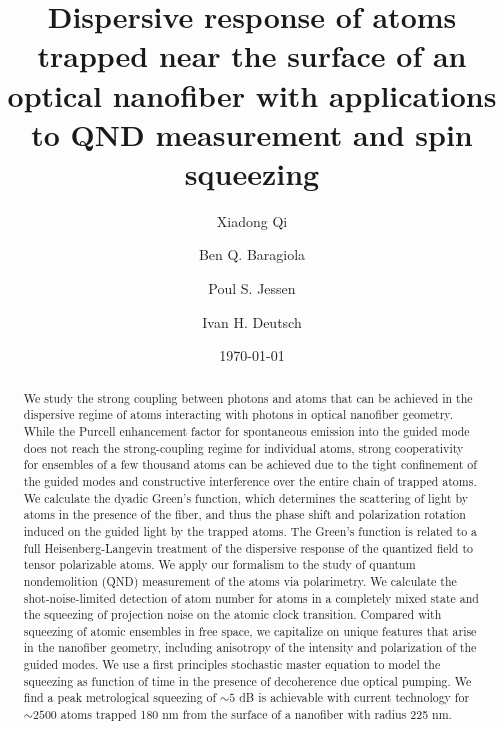 \documentclass[preprint, aps,pra,onecolumn]{revtex4-1} %
\begin{document}
\title{Dispersive response of atoms trapped near the surface of an optical nanofiber with applications to QND measurement and spin squeezing}
\author{Xiadong Qi}
\author{Ben Q. Baragiola}
\author{Poul S. Jessen}
\author{Ivan H. Deutsch}
\date{\today}

\begin{abstract}
We study the strong coupling between photons and atoms that can be achieved in the dispersive regime {\color{blue} of atoms interacting with photons in optical nanofiber geometry.}  While the Purcell enhancement factor for spontaneous emission into the guided mode does not reach the strong-coupling regime for individual atoms, strong cooperativity for ensembles of a few thousand atoms can be achieved due to the tight confinement of the guided modes and constructive interference over the entire chain of trapped atoms. We calculate the dyadic Green's function, which determines the scattering of light by atoms in the presence of the fiber, and thus the phase shift and polarization rotation induced on the guided light by the trapped atoms.  The Green's function is related to a full Heisenberg-Langevin treatment of the dispersive response of the quantized field to tensor polarizable atoms.  We apply our formalism to the study of quantum nondemolition (QND) measurement of the atoms via polarimetry.  We calculate the shot-noise-limited detection of atom number for atoms in a completely mixed state and the squeezing of projection noise on the atomic clock transition.  Compared with squeezing of atomic ensembles in free space, we capitalize on unique features that arise in the nanofiber geometry, including anisotropy of the intensity and polarization of the guided modes.  We use a first principles stochastic master equation to model the squeezing as function of time in the presence of decoherence due optical pumping.  We find a peak metrological squeezing of $\sim 5$ dB is achievable with current technology for $\sim 2500$ atoms trapped 180 nm from the surface of a nanofiber with radius 225 nm.  
\end{abstract}
\end{document}
